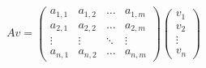 \documentclass[10pt]{article}
\begin{document}
\begin{equation*}
Av = \left(\begin{array}{cccc}
	a_{1,1}  &  a_{1,2} & \ldots  & a_{1,m} \\
	a_{2,1} & a_{2,2}   & \ldots  & a_{2,m} \\
	\vdots &  \vdots   & \ddots  & \vdots \\
	a_{n,1}  & a_{n,2} & \ldots  & a_{n,m} 
\end{array}\right)
\left(\begin{array}{c}
	v_{1} \\
	v_{2} \\
	\vdots \\
	v_{n} 
\end{array}\right)
\end{equation*}\\
\end{document}
